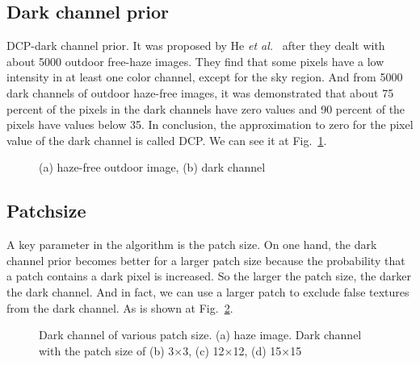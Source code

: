 \documentclass[10pt,twocolumn,letterpaper]{article}
\begin{document}
\subsection{Dark channel prior}
\par DCP-dark channel prior. It was proposed by He \emph {et al.}~\cite{He2009Single} after they dealt with about 5000 outdoor free-haze images. They find that some pixels have a low intensity in at least one color channel, except for the sky region. And from 5000 dark channels of outdoor haze-free images, it was demonstrated that about 75 percent of the pixels in the dark channels have zero values and 90 percent of the pixels have values below 35. In conclusion, the approximation to zero for the pixel value of the dark channel is called DCP. We can see it at Fig.~\ref{dark1}.
 \begin{figure}[htbp]
 \centering{}
 \hfill
{}
 \caption{(a) haze-free outdoor image, (b) dark channel}
\label{dark1}
\end{figure} 
\subsection{Patchsize}
 \par A key parameter in the algorithm is the patch size. On one hand, the dark channel prior becomes better for a larger patch size because the probability that a patch contains a dark pixel is increased. So the larger the patch size, the darker the dark channel. And in fact, we can use a larger patch to exclude false textures from the dark channel. As is shown at Fig.~\ref{dark2}.
\begin{figure}[t]
 \hfill
{}
\hfill
 \hfill
{}
 \caption{Dark channel of various patch size. (a) haze image. Dark channel with the patch size of (b) 3$\times$3, (c) 12$\times$12, (d) 15$\times$15}
\label{dark2}
\end{figure}
\end{document}
